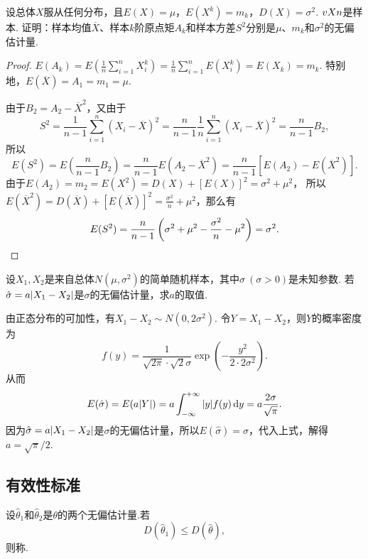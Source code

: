 \begin{example}
设总体\(X\)服从任何分布，且\(E(X)=\mu\)，\(E(X^k)=m_k\)，\(D(X)=\sigma^2\).
\(v{X}{n}\)是样本.
证明：样本均值\(\overline{X}\)、样本\(k\)阶原点矩\(A_k\)和样本方差\(S^2\)分别是\(\mu\)、\(m_k\)和\(\sigma^2\)的无偏估计量.
\begin{proof}
\(E(A_k)=E\left(\frac{1}{n} \sum\limits_{i=1}^n{X_i^k}\right)
=\frac{1}{n} \sum\limits_{i=1}^n{E(X_i^k)} = E(X_k) = m_k\).
特别地，\(E(\overline{X}) = A_1 = m_1 = \mu\).

由于\(B_2 = A_2 - \overline{X}^2\)，又由于\[
S^2 = \frac{1}{n-1} \sum\limits_{i=1}^n{(X_i-\overline{X})^2}
= \frac{n}{n-1} \frac{1}{n} \sum\limits_{i=1}^n{(X_i-\overline{X})^2}
= \frac{n}{n-1} B_2,
\]所以\[
E(S^2) = E\left(\frac{n}{n-1} B_2\right) = \frac{n}{n-1} E(A_2-\overline{X}^2) = \frac{n}{n-1}[E(A_2)-E(\overline{X}^2)].
\]
由于\(E(A_2) = m_2 = E(X^2) = D(X)+[E(X)]^2 = \sigma^2+\mu^2\)，%
所以\(E(\overline{X}^2) = D(\overline{X})+[E(\overline{X})]^2 = \frac{\sigma^2}{n} + \mu^2\)，那么有\[
E(S^2) = \frac{n}{n-1} \left(\sigma^2 + \mu^2 - \frac{\sigma^2}{n} - \mu^2\right) = \sigma^2.
\qedhere
\]
\end{proof}
\end{example}

\begin{example}
设\(X_1,X_2\)是来自总体\(N(\mu,\sigma^2)\)的简单随机样本，其中\(\sigma\ (\sigma>0)\)是未知参数.
若\(\hat{\sigma} = a\abs{X_1-X_2}\)是\(\sigma\)的无偏估计量，求\(a\)的取值.
\begin{solution}
由正态分布的可加性，有\(X_1-X_2 \sim N(0,2\sigma^2)\).
令\(Y = X_1-X_2\)，则\(Y\)的概率密度为\[
f(y) = \frac{1}{\sqrt{2\pi} \cdot \sqrt{2} \sigma} \exp(-\frac{y^2}{2 \cdot 2 \sigma^2}).
\]从而\[
E(\hat{\sigma}) = E(a \abs{Y})
= a \int_{-\infty}^{+\infty} \abs{y} f(y) \dd{y}
= a \frac{2 \sigma}{\sqrt{\pi}}.
\]因为\(\hat{\sigma} = a\abs{X_1-X_2}\)是\(\sigma\)的无偏估计量，所以\(E(\hat{\sigma}) = \sigma\)，代入上式，解得\(a = \sqrt{\pi}/2\).
\end{solution}
\end{example}

\subsection{有效性标准}
\begin{definition}
设\(\hat{\theta}_1\)和\(\hat{\theta}_2\)是\(\theta\)的两个无偏估计量.若\[
D(\hat{\theta}_1) \leqslant D(\hat{\theta}),
\]则称.
\end{definition}

